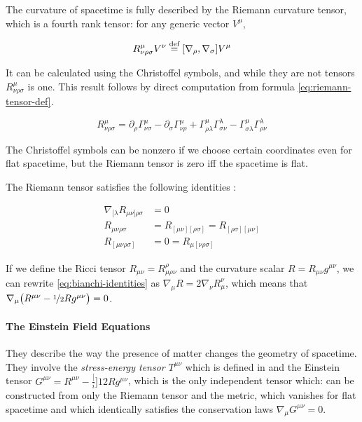 \documentclass[main.tex]{subfiles}
\begin{document}
The curvature of spacetime is fully described by the Riemann curvature tensor, which is a fourth rank tensor: for any generic vector \(V^\mu\),

\begin{equation} \label{eq:riemann-tensor-def}
    R ^{\mu} _{\nu \rho \sigma} V^\nu \stackrel{\text{def}}{=} [\nabla_\rho, \nabla_\sigma]   V^\mu
\end{equation}

It can be calculated using the Christoffel symbols, and while they are not tensors \(R ^{\mu} _{\nu \rho \sigma}\) is one. This result follows by direct computation from formula \eqref{eq:riemann-tensor-def}.

\begin{equation}
    R ^{\mu} _{\nu \rho \sigma} =
     \partial_\rho \Gamma^\mu_{\nu \sigma}
    -\partial_\sigma \Gamma^\mu_{\nu \rho}
    +\Gamma^\mu_{\rho \lambda} \Gamma ^{\lambda} _{\sigma \nu}
    -\Gamma^\mu_{\sigma \lambda} \Gamma ^{\lambda} _{\rho \nu}
\end{equation}

The Christoffel symbols can be nonzero if we choose certain coordinates even for flat spacetime, but the Riemann tensor is zero iff the spacetime is flat.

The Riemann tensor satisfies the following identities \cite[eqs. 8.45 and 8.76]{MisnerThorneWheeler:1973}:

\begin{subequations}
\begin{align}
  \nabla _{[\lambda} R_{\mu\nu]\rho \sigma} &= 0 \label{eq:bianchi-identities}  \\
  R_{\mu\nu\rho\sigma} &= R_{[\mu\nu][\rho\sigma]} = R_{[\rho\sigma][\mu\nu]}  \\
  R_{[\mu\nu\rho\sigma]} &= 0 = R_{\mu[\nu\rho\sigma]}
\end{align}
\end{subequations}

If we define the Ricci tensor \(R_{\mu\nu} = R^\rho_{\mu \rho \nu}\) and the curvature scalar \(R = R_{\mu\nu}g^{\mu\nu}\), we can rewrite \eqref{eq:bianchi-identities}  as \(\nabla_\mu R = 2 \nabla_\nu R^{\nu}_{\mu}\), which means that \(\nabla_\mu \qty(R^{\mu\nu} - \frac[i]{1}{2} R g^{\mu\nu}) = 0\).

\paragraph{The Einstein Field Equations}

They describe the way the presence of matter changes the geometry of spacetime.
They involve the \emph{stress-energy tensor} \(T^{\mu\nu}\) which is defined in  and the Einstein tensor \(G^{\mu\nu} = R^{\mu\nu} - \frac[i]{1}{2} R g^{\mu\nu}\), which is the only independent tensor which: can be constructed from only the Riemann tensor and the metric, which vanishes for flat spacetime and which identically satisfies the conservation laws \(\nabla_\mu G^{\mu\nu} = 0\).
\end{document}
